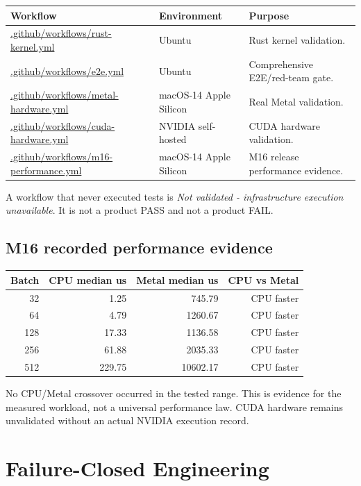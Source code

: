 \documentclass[11pt,a4paper]{report}
\newcommand{\pathref}[1]{\url{#1}}
\begin{document}
\begin{longtable}{@{}p{}p{}p{}@{}}
\toprule
Workflow & Environment & Purpose \\
\midrule
\pathref{.github/workflows/rust-kernel.yml} & Ubuntu & Rust kernel validation. \\
\pathref{.github/workflows/e2e.yml} & Ubuntu & Comprehensive E2E/red-team gate. \\
\pathref{.github/workflows/metal-hardware.yml} & macOS-14 Apple Silicon & Real Metal validation. \\
\pathref{.github/workflows/cuda-hardware.yml} & NVIDIA self-hosted & CUDA hardware validation. \\
\pathref{.github/workflows/m16-performance.yml} & macOS-14 Apple Silicon & M16 release performance evidence. \\
\bottomrule
\end{longtable}

A workflow that never executed tests is \textit{Not validated - infrastructure execution unavailable}. It is not a product PASS and not a product FAIL.

\section{M16 recorded performance evidence}

\begin{tabular}{@{}rrrr@{}}
\toprule
Batch & CPU median us & Metal median us & CPU vs Metal \\
\midrule
32  & 1.25  & 745.79  & CPU faster \\
64  & 4.79  & 1260.67 & CPU faster \\
128 & 17.33 & 1136.58 & CPU faster \\
256 & 61.88 & 2035.33 & CPU faster \\
512 & 229.75 & 10602.17 & CPU faster \\
\bottomrule
\end{tabular}

No CPU/Metal crossover occurred in the tested range. This is evidence for the measured workload, not a universal performance law. CUDA hardware remains unvalidated without an actual NVIDIA execution record.

\chapter{Failure-Closed Engineering}
\end{document}
